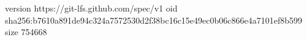 version https://git-lfs.github.com/spec/v1
oid sha256:b7610a891de94c324a7572530d2f38bc16c15e49ec0b06c866e4a7101ef8b599
size 754668
